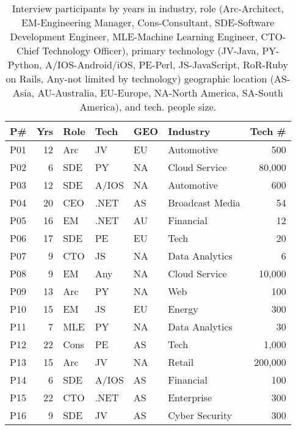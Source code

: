
\begin{table}[]
    \centering
        \caption{Interview participants by years in industry, role (Arc-Architect, EM-Engineering Manager, Cons-Consultant, SDE-Software Development Engineer, MLE-Machine Learning Engineer, CTO-Chief Technology Officer), primary technology (JV-Java, PY-Python, A/IOS-Android/iOS, PE-Perl, JS-JavaScript, RoR-Ruby on Rails, Any-not limited by technology) geographic location (AS-Asia, AU-Australia, EU-Europe, NA-North America, SA-South America), and tech. people size.}
    \begin{tabular}{lrlll|lr}
\toprule
P\# & Yrs & Role & Tech & GEO & Industry & Tech \# \\
\midrule
P01 & 12 & Arc & JV & EU & Automotive & 500  \\ 
P02 & 6 & SDE & PY & NA & Cloud Service & 80,000  \\ 
P03 & 12 & SDE & A/IOS & NA & Automotive & 600  \\ 
P04 & 20 & CEO & .NET & AS & Broadcast Media & 54  \\ 
P05 & 16 & EM & .NET & AU & Financial & 12 \\ 
P06 & 17 & SDE & PE & EU & Tech & 20 \\ 
P07 & 9 & CTO & JS & NA & Data Analytics & 6 \\ 
P08 & 9 & EM & Any & NA & Cloud Service & 10,000 \\ 
P09 & 13 & Arc & PY & NA & Web & 100 \\ 
P10 & 15 & EM & JS & EU & Energy & 300 \\ 
P11 & 7 & MLE & PY & NA & Data Analytics & 30 \\ 
P12 & 22 & Cons & PE & AS & Tech & 1,000 \\ 
P13 & 15 & Arc & JV & NA & Retail & 200,000 \\ 
P14 & 6 & SDE & A/IOS & AS & Financial & 100 \\ 
P15 & 22 & CTO & .NET & AS & Enterprise & 300 \\ 
P16 & 9 & SDE & JV & AS & Cyber Security & 300 \\ 

\end{tabular}
\end{table}
